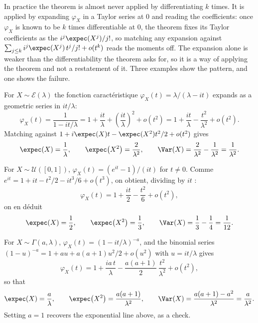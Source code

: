 In practice the theorem is almost never applied by differentiating $k$ times. It is applied
by expanding $\varphi_{X}$ in a Taylor series at $0$ and reading the coefficients: once
$\varphi_{X}$ is known to be $k$ times differentiable at $0$, the theorem fixes its Taylor
coefficients as the $i^{j}\expec(X^{j})/j!$, so matching any expansion against
$\sum_{j \leq k} i^{j}\expec(X^{j})\,t^{j}/j! + o(t^{k})$ reads the moments off. The
expansion alone is weaker than the differentiability the theorem asks for, so it is a way of
applying the theorem and not a restatement of it. Three examples show the pattern, and one
shows the failure.

\begin{example}
For $X \sim \mathcal{E}(\lambda)$ the fonction caractéristique $\varphi_{X}(t) =
\lambda/(\lambda - it)$ expands as a geometric series in $it/\lambda$:
\[
  \varphi_{X}(t) = \frac{1}{1 - it/\lambda} = 1 + \frac{it}{\lambda} +
  \left(\frac{it}{\lambda}\right)^{2} + o(t^{2}) = 1 + \frac{it}{\lambda} -
  \frac{t^{2}}{\lambda^{2}} + o(t^{2}).
\]
Matching against $1 + i\expec(X)t - \expec(X^{2})t^{2}/2 + o(t^{2})$ gives
\[
  \expec(X) = \frac{1}{\lambda}, \qquad \expec\!\left(X^{2}\right) = \frac{2}{\lambda^{2}},
  \qquad \Var(X) = \frac{2}{\lambda^{2}} - \frac{1}{\lambda^{2}} = \frac{1}{\lambda^{2}}.
\]
\end{example}

\begin{example}
For $X \sim \mathcal{U}([0,1])$, $\varphi_{X}(t) = \left(e^{it}-1\right)/(it)$ for $t \neq
0$. Comme $e^{it} = 1 + it - t^{2}/2 - it^{3}/6 + o(t^{3})$, on obtient, dividing by $it$ :
\[
  \varphi_{X}(t) = 1 + \frac{it}{2} - \frac{t^{2}}{6} + o(t^{2}),
\]
on en déduit
\[
  \expec(X) = \frac{1}{2}, \qquad \expec\!\left(X^{2}\right) = \frac{1}{3}, \qquad \Var(X) =
  \frac{1}{3} - \frac{1}{4} = \frac{1}{12}.
\]
\end{example}

\begin{example}
For $X \sim \Gamma(a,\lambda)$, $\varphi_{X}(t) = (1 - it/\lambda)^{-a}$, and the binomial
series $(1-u)^{-a} = 1 + au + a(a+1)u^{2}/2 + o(u^{2})$ with $u = it/\lambda$ gives
\[
  \varphi_{X}(t) = 1 + \frac{ia\,t}{\lambda} - \frac{a(a+1)}{2}\,\frac{t^{2}}{\lambda^{2}} +
  o(t^{2}),
\]
so that
\[
  \expec(X) = \frac{a}{\lambda}, \qquad \expec\!\left(X^{2}\right) =
  \frac{a(a+1)}{\lambda^{2}}, \qquad \Var(X) = \frac{a(a+1) - a^{2}}{\lambda^{2}} =
  \frac{a}{\lambda^{2}}.
\]
Setting $a = 1$ recovers the exponential line above, as a check.
\end{example}

